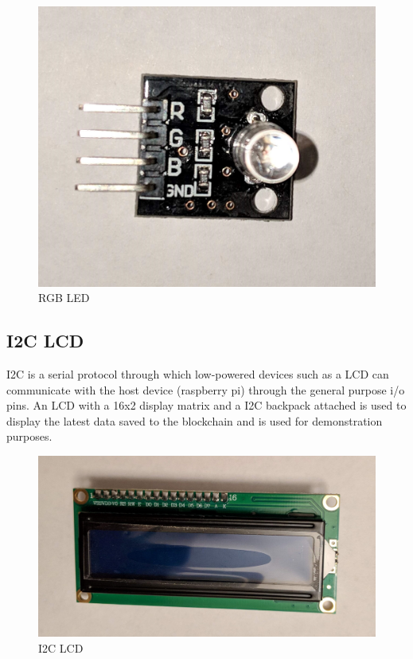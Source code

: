 \documentclass[11pt,openright]{report}
\begin{document}
\begin{figure}
	\centering
	\includegraphics[scale=0.1]{images/rgb_led.jpg}
	\caption{RGB LED}
	\label{fig:rgb_led}
\end{figure}

\subsection{I2C LCD}
I2C is a serial protocol through which low-powered devices such as a LCD can communicate with the host device (raspberry pi) through the general purpose i/o pins. 
An LCD with a 16x2 display matrix and a I2C backpack attached is used to display the latest data saved to the blockchain and is used for demonstration purposes. 
\begin{figure}
	\centering
	\includegraphics[scale=0.1]{images/i2c_lcd.jpg}
	\caption{I2C LCD}
	\label{fig:i2c_lcd}
\end{figure}
\end{document}
